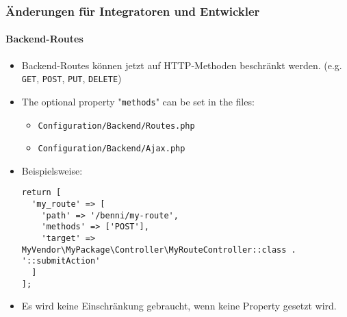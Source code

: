 %

\begin{frame}[fragile]
	\frametitle{Änderungen für Integratoren und Entwickler}
	\framesubtitle{Backend-Routes}


	\begin{itemize}
		\item Backend-Routes können jetzt auf HTTP-Methoden beschränkt werden.\newline
			\small(e.g. \texttt{GET}, \texttt{POST}, \texttt{PUT}, \texttt{DELETE})
		\item The optional property "\texttt{methods}" can be set in the files:
			\begin{itemize}\smaller
				\item \texttt{Configuration/Backend/Routes.php}
				\item \texttt{Configuration/Backend/Ajax.php}
			\end{itemize}
			\vspace{0.2cm}
		\item Beispielsweise:
\begin{lstlisting}
return [
  'my_route' => [
    'path' => '/benni/my-route',
    'methods' => ['POST'],
    'target' => MyVendor\MyPackage\Controller\MyRouteController::class . '::submitAction'
  ]
];
\end{lstlisting}

		\item Es wird keine Einschränkung gebraucht, wenn keine Property gesetzt wird.

	\end{itemize}

\end{frame}

